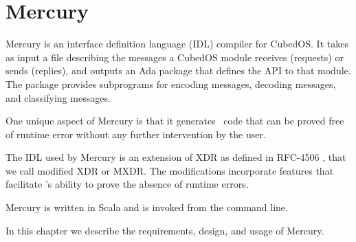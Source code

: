 
\chapter{Mercury}
\label{chapt:mercury}

Mercury is an interface definition language (IDL) compiler for CubedOS. It takes as input a file
describing the messages a CubedOS module receives (requests) or sends (replies), and outputs an
Ada package that defines the API to that module. The package provides subprograms for encoding
messages, decoding messages, and classifying messages.

One unique aspect of Mercury is that it generates \SPARK\ code that can be proved free of
runtime error without any further intervention by the user.

The IDL used by Mercury is an extension of XDR as defined in RFC-4506 \cite{rfc-4506}, that we
call modified XDR or MXDR. The modifications incorporate features that facilitate \SPARK's
ability to prove the absence of runtime errors.

Mercury is written in Scala and is invoked from the command line.

In this chapter we describe the requirements, design, and usage of Mercury.




